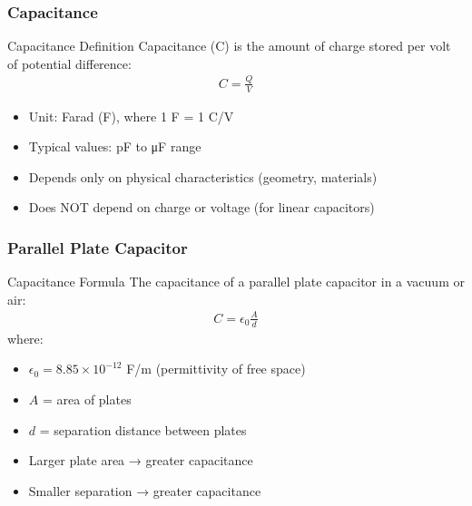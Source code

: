 \documentclass{beamer}
\begin{document}
\begin{frame}
    \frametitle{Capacitance}
    
    \begin{block}{Capacitance Definition}
        Capacitance (C) is the amount of charge stored per volt of potential difference:
        \begin{align}
            C = \frac{Q}{V}
        \end{align}
    \end{block}
    
    \begin{itemize}
        \item Unit: Farad (F), where 1 F = 1 C/V
        \item Typical values: pF to μF range
        \item Depends only on physical characteristics (geometry, materials)
        \item Does NOT depend on charge or voltage (for linear capacitors)
    \end{itemize}
\end{frame}

\begin{frame}
    \frametitle{Parallel Plate Capacitor}
    
    \begin{block}{Capacitance Formula}
        The capacitance of a parallel plate capacitor in a vacuum or air:
        \begin{align}
            C = \epsilon_0 \frac{A}{d}
        \end{align}
        where:
        \begin{itemize}
            \item $\epsilon_0 = 8.85 \times 10^{-12}$ F/m (permittivity of free space)
            \item $A$ = area of plates
            \item $d$ = separation distance between plates
        \end{itemize}
    \end{block}
    
    \begin{itemize}
        \item Larger plate area → greater capacitance
        \item Smaller separation → greater capacitance
    \end{itemize}
\end{frame}
\end{document}
